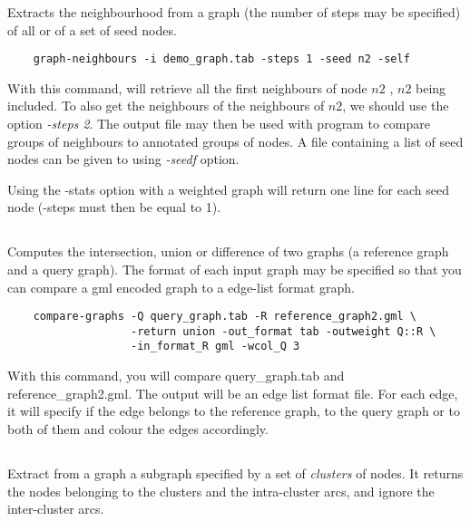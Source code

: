 Extracts the neighbourhood from a graph (the number of steps may be specified) of all or of a set of seed nodes.

{\begin{footnotesize}\begin{verbatim}
    graph-neighbours -i demo_graph.tab -steps 1 -seed n2 -self
\end{verbatim} \end{footnotesize}
}

With this command,  will retrieve all the first neighbours of node $n2$ , $n2$ being included.
To also get the neighbours of the neighbours of $n2$, we should use the option \textit{-steps 2}.
The output file may then be used with  program to compare groups of neighbours to annotated groups of nodes. A file containing a list of seed nodes can
be given to  using \textit{-seedf} option.

Using the -stats option with a weighted graph will return one line for each seed node (-steps must then be equal to 1).

\subsection{}

Computes the intersection, union or difference of two graphs (a reference graph and a query graph).
The format of each input graph may be specified so that you can compare a gml encoded graph to a edge-list format graph.

{\begin{footnotesize}\begin{verbatim}
    compare-graphs -Q query_graph.tab -R reference_graph2.gml \
                   -return union -out_format tab -outweight Q::R \
                   -in_format_R gml -wcol_Q 3

\end{verbatim} \end{footnotesize}
}

With this command, you will compare query\_graph.tab and reference\_graph2.gml. The output will be an edge list format file. 
For each edge, it will specify if the edge belongs to the reference graph, to the query graph or to both of them and colour the edges accordingly.

\subsection{\program{graph-get-clusters}}
Extract from a graph a subgraph specified by a set of \textit{clusters} of nodes. 
It returns the nodes belonging to the clusters and the intra-cluster arcs, and ignore the inter-cluster arcs.

